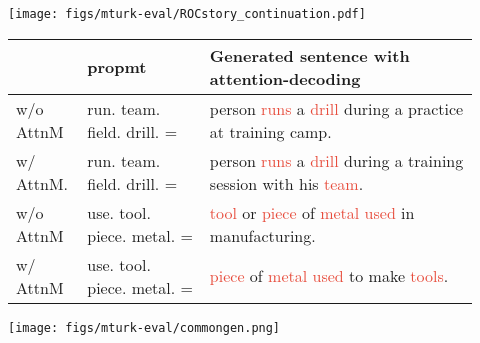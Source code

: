 \documentclass[11pt,a4paper]{article}
\newcommand{\alg}{attention modulation}
\begin{document}
\begin{figure*}[ht]
\centering
\texttt{[image: figs/mturk-eval/ROCstory\_continuation.pdf]}
\caption{\small Mechanical Turk template used to evaluate ROCstories generations.}
\label{fig:roc_template}
\end{figure*}



\begin{table*}[ht]
    \centering
    \begin{tabular}{p{0.12\linewidth} | p{0.25\linewidth} | p{0.55\linewidth}}
    \toprule
      &propmt & Generated sentence with attention-decoding \\\midrule
w/o AttnM &run. team. field. drill. = &  person \textcolor[HTML]{e74c3c}{runs} a \textcolor[HTML]{e74c3c}{drill} during a practice at training camp. \\ 

w/ AttnM. &run. team. field. drill. = &
person \textcolor[HTML]{e74c3c}{runs} a \textcolor[HTML]{e74c3c}{drill} during a training session with his \textcolor[HTML]{e74c3c}{team}.\\ \midrule
w/o AttnM &use. tool. piece. metal. = & \textcolor[HTML]{e74c3c}{tool} or \textcolor[HTML]{e74c3c}{piece} of \textcolor[HTML]{e74c3c}{metal} \textcolor[HTML]{e74c3c}{used} in manufacturing.\\
w/ AttnM &use. tool. piece. metal. =& \textcolor[HTML]{e74c3c}{piece} of \textcolor[HTML]{e74c3c}{metal} \textcolor[HTML]{e74c3c}{used} to make \textcolor[HTML]{e74c3c}{tools}.\\ \bottomrule

    \end{tabular}
    \caption{ Examples produced by GPT2-L without  and with  \alg{}.   Use \alg{} would have higher concept coverage (details in Table 3 in the main text with 5\% coverage improvements on all decoding algorithms we tested);}
    \label{tab:example_concept_coverage}
\end{table*}
\vspace{-2cm}
\begin{figure*}[t]
\centering
\texttt{[image: figs/mturk-eval/commongen.png]}
\caption{\small Mechanical Turk template used to evaluate CommonGen generations.}
\label{fig:commongen_template}
\end{figure*}
\end{document}
